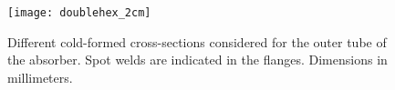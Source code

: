 \documentclass[
documentsize = octavo, %
printmode = true, %
font = cmr, %
typesize = 10, %
fontsize = normalsize, %
onehalfspacing = false, %
language = en, %
degree = phd, %
titlelogo = udc, %
titlepage = true, %
dedication = true, %
preface = true, %
acknowledgements = true, %
abstract-en = true, %
abstract-es = true, %
abstract-ga = true, %
epigraphs = true, %
toc = true, %
lof = true, %
lot = true, %
notation = true, %
biblatex-globalbib = true, %
biblatex-chapterbib = true, %
frontmatterintoc = true, %
printby = true, %
debug = false, %
draft = false, %
showlayout = false, %
]{UDCthesis}
\begin{document}
\begin{figure}[htpb]
  \centering
  \texttt{[image: doublehex\_2cm]}
  \caption{Different cold-formed cross-sections considered for the outer tube of the absorber. Spot welds are indicated in the flanges. Dimensions in millimeters.}
  \label{fig:geometrias}
\end{figure}
\end{document}
